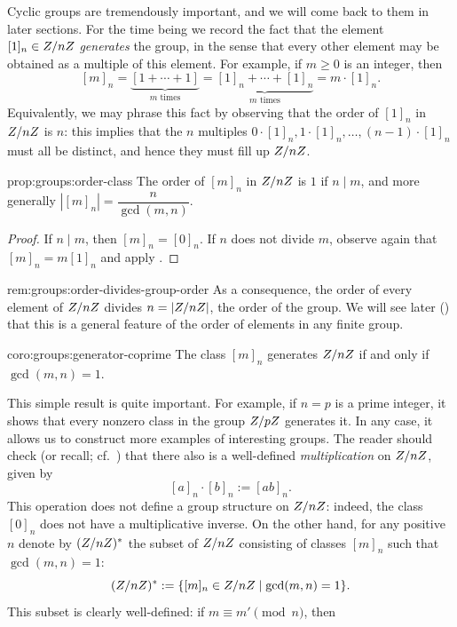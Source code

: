Cyclic groups are tremendously important, and we will come back to
them in later sections. For the time being we record the fact that the
element $[1]_n \in Z/nZ$ \textit{generates} the group, in the sense
that every other element may be obtained as a multiple of this
element. For example, if $m \geq 0$ is an integer, then
\[ [m]_n = \underbrace{[1+\cdots+1]}_{\text{$m$ times}} =
  \underbrace{[1]_n + \cdots + [1]_n}_{\text{$m$ times}} = m \cdot
  [1]_n.
\]
Equivalently, we may phrase this fact by observing that the order of
$[1]_n$ in $Z/nZ$ is $n$: this implies that the $n$ multiples
$0 \cdot [1]_n, 1 \cdot [1]_n, \ldots, (n-1) \cdot [1]_n$ must all be
distinct, and hence they must fill up $Z/nZ$.
\begin{prop}{}{prop:groups:order-class}
  The order of $[m]_n$ in $Z/nZ$ is $1$ if $n \mid m$, and more
  generally $|[m]_n| = \dfrac{n}{\gcd(m,n)}$.
\end{prop}
\begin{proof}
  If $n \mid m$, then $[m]_n = [0]_n$. If $n$ does not divide $m$,
  observe again that $[m]_n = m[1]_n$ and apply
  .
\end{proof}
\begin{rem}{}{rem:groups:order-divides-group-order}
  As a consequence, the order of every element of $Z/nZ$ divides
  $n = |Z/nZ|$, the order of the group. We will see later
  () that this is a
  general feature of the order of elements in any finite group.
\end{rem}
\begin{coro}{}{coro:groups:generator-coprime}
  The class $[m]_n$ generates $Z/nZ$ if and only if $\gcd(m,n) = 1$.
\end{coro}
This simple result is quite important. For example, if $n = p$ is a
prime integer, it shows that every nonzero class in the group $Z/pZ$
generates it. In any case, it allows us to construct more examples of
interesting groups. The reader should check (or recall; cf.\
) that there also is a
well-defined \textit{multiplication} on $Z/nZ$, given by
\[ [a]_n \cdot [b]_n := [ab]_n.
\]
This operation does not define a group structure on $Z/nZ$: indeed,
the class $[0]_n$ does not have a multiplicative inverse. On the other
hand, for any positive $n$ denote by $(Z/nZ)^*$ the subset of
$Z/nZ$ consisting of classes $[m]_n$ such that $\gcd(m,n)=1$:
\[
  (Z/nZ)^* := \{[m]_n \in Z/nZ \mid \gcd(m,n)=1\}.
\]
This subset is clearly well-defined: if $m \equiv m' \pmod{n}$, then
